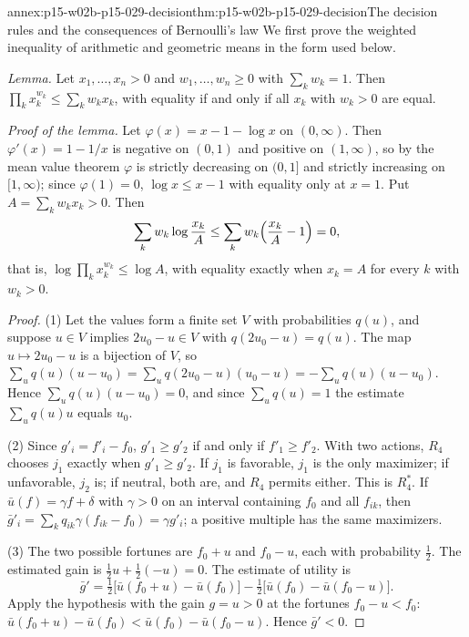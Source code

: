 \begin{annexitem}{annex:p15-w02b-p15-029-decision}{thm:p15-w02b-p15-029-decision}{The decision rules and the consequences of Bernoulli's law}
We first prove the weighted inequality of arithmetic and geometric
means in the form used below.

\emph{Lemma.} Let \(x_1,\ldots,x_n>0\) and \(w_1,\ldots,w_n\geq0\)
with \(\sum_kw_k=1\). Then \(\prod_kx_k^{w_k}\leq\sum_kw_kx_k\), with
equality if and only if all \(x_k\) with \(w_k>0\) are equal.

\emph{Proof of the lemma.} Let \(\varphi(x)=x-1-\log x\) on
\((0,\infty)\). Then \(\varphi'(x)=1-1/x\) is negative on \((0,1)\)
and positive on \((1,\infty)\), so by the mean value theorem
\(\varphi\) is strictly decreasing on \((0,1]\) and strictly
increasing on \([1,\infty)\); since \(\varphi(1)=0\),
\(\log x\leq x-1\) with equality only at \(x=1\). Put
\(A=\sum_kw_kx_k>0\). Then
\[
 \sum_kw_k\log\frac{x_k}A\leq\sum_kw_k\Bigl(\frac{x_k}A-1\Bigr)=0,
\]
that is, \(\log\prod_kx_k^{w_k}\leq\log A\), with equality exactly
when \(x_k=A\) for every \(k\) with \(w_k>0\).

\begin{proof}
(1) Let the values form a finite set \(V\) with probabilities
\(q(u)\), and suppose \(u\in V\) implies \(2u_0-u\in V\) with
\(q(2u_0-u)=q(u)\). The map \(u\mapsto2u_0-u\) is a bijection of
\(V\), so
\(\sum_{u}q(u)(u-u_0)=\sum_uq(2u_0-u)(u_0-u)=-\sum_uq(u)(u-u_0)\).
Hence \(\sum_uq(u)(u-u_0)=0\), and since \(\sum_uq(u)=1\) the
estimate \(\sum_uq(u)u\) equals \(u_0\).

(2) Since \(g'_i=f'_i-f_0\), \(g'_1\geq g'_2\) if and only if
\(f'_1\geq f'_2\). With two actions, \(R_4\) chooses \(j_1\) exactly
when \(g'_1\geq g'_2\). If \(j_1\) is favorable, \(j_1\) is the only
maximizer; if unfavorable, \(j_2\) is; if neutral, both are, and \(R_4\)
permits either. This is \(R_4^*\). If \(\bar u(f)=\gamma f+\delta\) with
\(\gamma>0\) on an interval containing \(f_0\) and all \(f_{ik}\), then
\(\bar g'_i=\sum_kq_{ik}\gamma(f_{ik}-f_0)=\gamma g'_i\); a positive
multiple has the same maximizers.

(3) The two possible fortunes are \(f_0+u\) and \(f_0-u\), each with
probability \(\tfrac12\). The estimated gain is
\(\tfrac12u+\tfrac12(-u)=0\). The estimate of utility is
\[
 \bar g'=\tfrac12\bigl[\bar u(f_0+u)-\bar u(f_0)\bigr]
         -\tfrac12\bigl[\bar u(f_0)-\bar u(f_0-u)\bigr].
\]
Apply the hypothesis with the gain \(g=u>0\) at the fortunes
\(f_0-u<f_0\): \(\bar u(f_0+u)-\bar u(f_0)<\bar u(f_0)-\bar u(f_0-u)\).
Hence \(\bar g'<0\).


\end{proof}
\end{annexitem}
